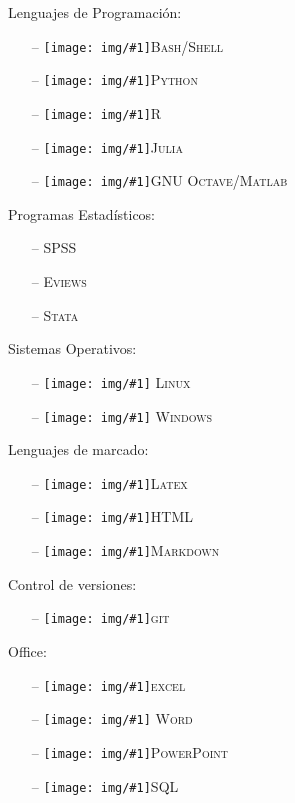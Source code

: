 \documentclass[a4paper,10pt]{article}
\newcommand{\icon}[1]{\texttt{[image: img/\#1]}}
\begin{document}
\begin{minipage}[b]{\textwidth}
\begin{minipage}[b]{0.5 \textwidth}
	Lenguajes de Programación:
	\begin{itemize}
				\item[--] \icon{gnubash.png}\textsc{Bash/Shell}
				\item[--] \icon{python.png}\textsc{Python}
				\item[--] \icon{r.png}\textsc{R}
				\item[--] \icon{julia.png}\textsc{Julia}
				\item[--] \icon{octave.png}\textsc{GNU Octave/Matlab}
\end{itemize} \end{minipage} \hfill
\begin{minipage}[b]{0.5 \textwidth}
	Programas Estadísticos:
	\begin{itemize}
				\item[--] \textsc{SPSS}
				\item[--] \textsc{Eviews}
				\item[--] \textsc{Stata}
	\end{itemize}
	Sistemas Operativos:
	\begin{itemize}
					\item[--] \icon{linux.png} \textsc{Linux} 
					\item[--] \icon{windows.png} \textsc{Windows}
	\end{itemize}
\end{minipage}\end{minipage}


\begin{minipage}[b]{\textwidth}
\begin{minipage}[b]{0.5 \textwidth}
	Lenguajes de marcado:
	\begin{itemize}
					\item[--]  \icon{latex.png}\textsc{Latex}
					\item[--]  \icon{html5.png}\textsc{HTML}
					\item[--]  \icon{markdown.png}\textsc{Markdown}
	\end{itemize}
	Control de versiones:
	\begin{itemize}
					\item[--] \icon{git.png}\textsc{git}
\end{itemize} \end{minipage} \hfill
 \begin{minipage}[b]{0.5 \textwidth}
	Office:
 \begin{itemize}
				 \item[--] \icon{microsoftexcel.png}\textsc{excel}          
				 \item[--] \icon{microsoftword.png} \textsc{Word}  
				 \item[--] \icon{microsoftpowerpoint.png}\textsc{PowerPoint}
				 \item[--] \icon{mysql.png}\textsc{SQL} 
 \end{itemize}
\end{minipage}\end{minipage} 
\end{document}
